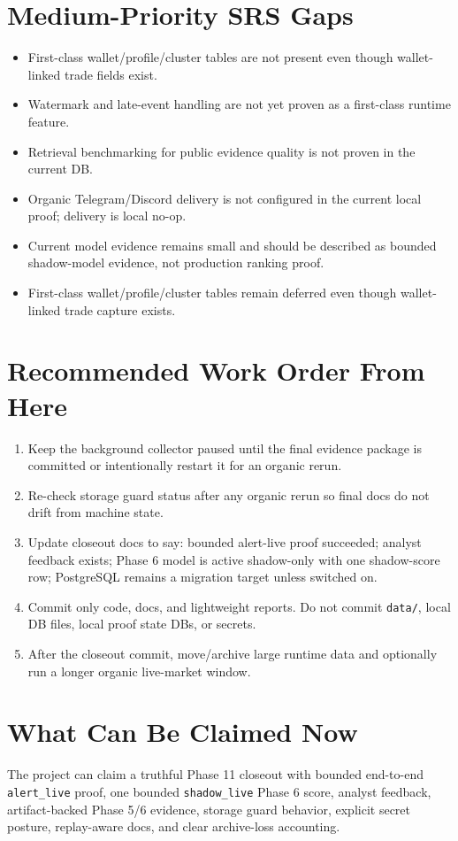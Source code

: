 \documentclass{article}
\begin{document}
\section*{Medium-Priority SRS Gaps}
\begin{itemize}
\item First-class wallet/profile/cluster tables are not present even though wallet-linked trade fields exist.
\item Watermark and late-event handling are not yet proven as a first-class runtime feature.
\item Retrieval benchmarking for public evidence quality is not proven in the current DB.
\item Organic Telegram/Discord delivery is not configured in the current local proof; delivery is local no-op.
\item Current model evidence remains small and should be described as bounded shadow-model evidence, not production ranking proof.
\item First-class wallet/profile/cluster tables remain deferred even though wallet-linked trade capture exists.
\end{itemize}

\section*{Recommended Work Order From Here}
\begin{enumerate}
\item Keep the background collector paused until the final evidence package is committed or intentionally restart it for an organic rerun.
\item Re-check storage guard status after any organic rerun so final docs do not drift from machine state.
\item Update closeout docs to say: bounded alert-live proof succeeded; analyst feedback exists; Phase 6 model is active shadow-only with one shadow-score row; PostgreSQL remains a migration target unless switched on.
\item Commit only code, docs, and lightweight reports. Do not commit \texttt{data/}, local DB files, local proof state DBs, or secrets.
\item After the closeout commit, move/archive large runtime data and optionally run a longer organic live-market window.
\end{enumerate}

\section*{What Can Be Claimed Now}
The project can claim a truthful Phase 11 closeout with bounded end-to-end \texttt{alert\_live} proof, one bounded \texttt{shadow\_live} Phase 6 score, analyst feedback, artifact-backed Phase 5/6 evidence, storage guard behavior, explicit secret posture, replay-aware docs, and clear archive-loss accounting.
\end{document}
